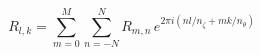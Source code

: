 \documentclass[a4paper, 12pt]{article}
\begin{document}
\begin{equation*}
   R_{l,k}
 = \sum\limits_{m= 0}^{M}
   \sum\limits_{n=-N}^{N}
     R_{m,n} \, e^{2 \pi i ( n l / n_\zeta + m k / n_\theta ) }
\end{equation*}
\end{document}
